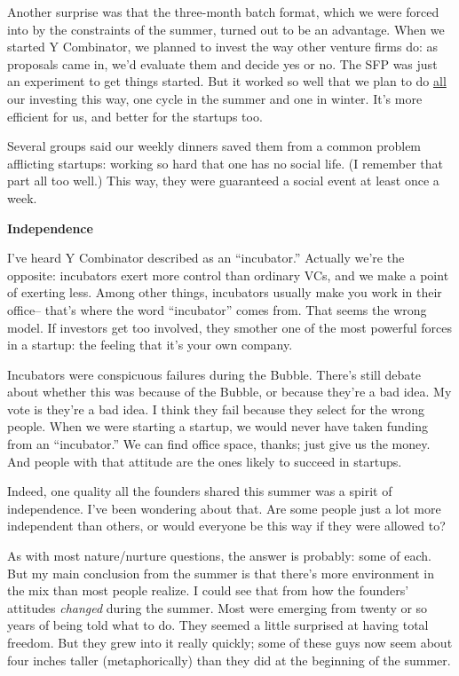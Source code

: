\documentclass[12pt]{book}
\begin{document}
Another surprise was that the three-month batch format, which we were
forced into by the constraints of the summer, turned out to be an
advantage. When we started Y Combinator, we planned to invest the way
other venture firms do: as proposals came in, we'd evaluate them and
decide yes or no. The SFP was just an experiment to get things started.
But it worked so well that we plan to do
\href{http://ycombinator.com/funding.html}{all} our investing this way,
one cycle in the summer and one in winter. It's more efficient for us,
and better for the startups too.

Several groups said our weekly dinners saved them from a common problem
afflicting startups: working so hard that one has no social life. (I
remember that part all too well.) This way, they were guaranteed a
social event at least once a week.

\textbf{Independence}

I've heard Y Combinator described as an ``incubator.'' Actually we're
the opposite: incubators exert more control than ordinary VCs, and we
make a point of exerting less. Among other things, incubators usually
make you work in their office-- that's where the word ``incubator''
comes from. That seems the wrong model. If investors get too involved,
they smother one of the most powerful forces in a startup: the feeling
that it's your own company.

Incubators were conspicuous failures during the Bubble. There's still
debate about whether this was because of the Bubble, or because they're
a bad idea. My vote is they're a bad idea. I think they fail because
they select for the wrong people. When we were starting a startup, we
would never have taken funding from an ``incubator.'' We can find office
space, thanks; just give us the money. And people with that attitude are
the ones likely to succeed in startups.

Indeed, one quality all the founders shared this summer was a spirit of
independence. I've been wondering about that. Are some people just a lot
more independent than others, or would everyone be this way if they were
allowed to?

As with most nature/nurture questions, the answer is probably: some of
each. But my main conclusion from the summer is that there's more
environment in the mix than most people realize. I could see that from
how the founders' attitudes \emph{changed} during the summer. Most were
emerging from twenty or so years of being told what to do. They seemed a
little surprised at having total freedom. But they grew into it really
quickly; some of these guys now seem about four inches taller
(metaphorically) than they did at the beginning of the summer.
\end{document}
